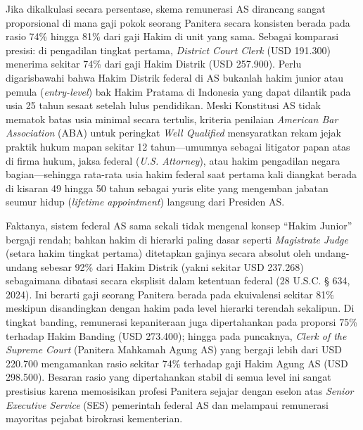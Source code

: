 \documentclass[12pt, a4paper]{article}
\begin{document}
Jika dikalkulasi secara persentase, skema remunerasi AS dirancang sangat proporsional di mana gaji pokok seorang Panitera secara konsisten berada pada rasio 74\% hingga 81\% dari gaji Hakim di unit yang sama. Sebagai komparasi presisi: di pengadilan tingkat pertama, \textit{District Court Clerk} (USD 191.300) menerima sekitar 74\% dari gaji Hakim Distrik (USD 257.900). Perlu digarisbawahi bahwa Hakim Distrik federal di AS bukanlah hakim junior atau pemula (\textit{entry-level}) bak Hakim Pratama di Indonesia yang dapat dilantik pada usia 25 tahun sesaat setelah lulus pendidikan. Meski Konstitusi AS tidak mematok batas usia minimal secara tertulis, kriteria penilaian \textit{American Bar Association} (ABA) untuk peringkat \textit{Well Qualified} mensyaratkan rekam jejak praktik hukum mapan sekitar 12 tahun---umumnya sebagai litigator papan atas di firma hukum, jaksa federal (\textit{U.S. Attorney}), atau hakim pengadilan negara bagian---sehingga rata-rata usia hakim federal saat pertama kali diangkat berada di kisaran 49 hingga 50 tahun sebagai yuris elite yang mengemban jabatan seumur hidup (\textit{lifetime appointment}) langsung dari Presiden AS.

Faktanya, sistem federal AS sama sekali tidak mengenal konsep ``Hakim Junior'' bergaji rendah; bahkan hakim di hierarki paling dasar seperti \textit{Magistrate Judge} (setara hakim tingkat pertama) ditetapkan gajinya secara absolut oleh undang-undang sebesar 92\% dari Hakim Distrik (yakni sekitar USD 237.268) sebagaimana dibatasi secara eksplisit dalam ketentuan federal (28 U.S.C. § 634, 2024). Ini berarti gaji seorang Panitera berada pada ekuivalensi sekitar 81\% meskipun disandingkan dengan hakim pada level hierarki terendah sekalipun. Di tingkat banding, remunerasi kepaniteraan juga dipertahankan pada proporsi 75\% terhadap Hakim Banding (USD 273.400); hingga pada puncaknya, \textit{Clerk of the Supreme Court} (Panitera Mahkamah Agung AS) yang bergaji lebih dari USD 220.700 mengamankan rasio sekitar 74\% terhadap gaji Hakim Agung AS (USD 298.500). Besaran rasio yang dipertahankan stabil di semua level ini sangat prestisius karena memosisikan profesi Panitera sejajar dengan eselon atas \textit{Senior Executive Service} (SES) pemerintah federal AS dan melampaui remunerasi mayoritas pejabat birokrasi kementerian.
\end{document}
